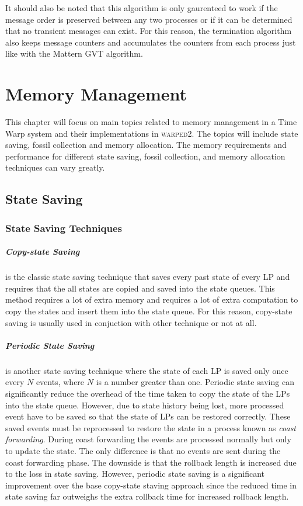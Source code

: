 \documentclass[11pt]{book}
\begin{document}
It should also be noted that this algorithm is only gaurenteed to work if the message order is
preserved between any two processes or if it can be determined that no transient messages can exist.
For this reason, the termination algorithm also keeps message counters and accumulates the counters
from each process just like with the Mattern GVT algorithm.



\chapter{Memory Management}\label{memory_management}

This chapter will focus on main topics related to memory management in a Time Warp system
and their implementations in \textsc{warped2}.  The topics will include state saving, fossil
collection and memory allocation.  The memory requirements and performance for different state
saving, fossil collection, and memory allocation techniques can vary greatly.

\section{State Saving}

\subsection{State Saving Techniques}

\paragraph{Copy-state Saving} is the classic state saving technique that saves every past
state of every LP and requires that the all states are copied and saved into the state queues.
This method requires a lot of extra memory and requires a lot of extra computation to copy
the states and insert them into the state queue.  For this reason, copy-state saving is
usually used in conjuction with other technique or not at all.

\paragraph{Periodic State Saving} is another state saving technique where the state of each LP
is saved only once every $N$ events, where $N$ is a number greater than one.  Periodic state
saving can significantly reduce the overhead of the time taken to copy the state of the
LPs into the state queue.  However, due to state history being lost, more processed event
have to be saved so that the state of LPs can be restored correctly.  These saved events
must be reprocessed to restore the state in a process known as \emph{coast forwarding}.
During coast forwarding the events are processed normally but only to update the state.
The only difference is that no events are sent during the coast forwarding phase.  The
downside is that the rollback length is increased due to the loss in state saving.  However,
periodic state saving is a significant improvement over the base copy-state staving approach
since the reduced time in state saving far outweighs the extra rollback time for increased
rollback length.
\end{document}
